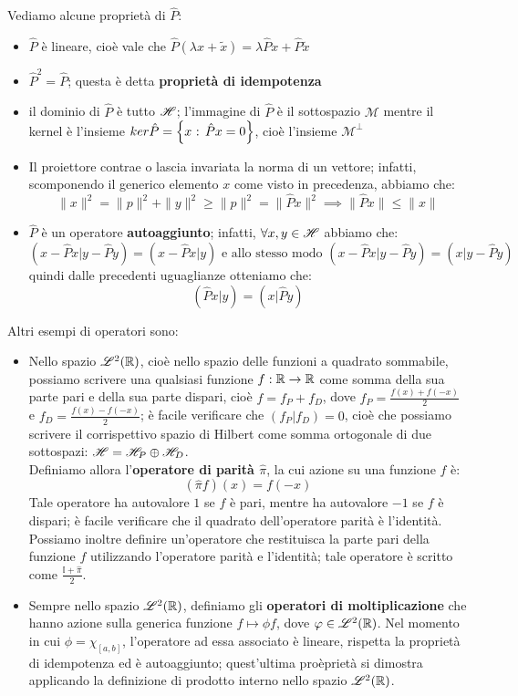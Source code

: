 Vediamo alcune proprietà di $\hat{P}$:
\begin{itemize}
\item $\hat{P}$ è lineare, cioè vale che $\hat{P}(\lambda x + \tilde{x})=\lambda \hat{P}x+\hat{P} \tilde{x}$
\item $\hat{P}^2=\hat{P}$; questa è detta \textbf{proprietà di idempotenza}
\item il dominio di $\hat{P}$ è tutto $\mathscr{H}$; l'immagine di $\hat{P}$ è il sottospazio $\mathcal{M}$ mentre il kernel è l'insieme $\\ker \hat{P} = \left\{ x \text{ : } \hat{P}x=0 \right\}$, cioè l'insieme $\mathcal{M}^{\perp}$
\item Il proiettore contrae o lascia invariata la norma di un vettore; infatti, scomponendo il generico elemento $x$ come visto in precedenza, abbiamo che:
$$\|x\|^2=\|p\|^2+\|y\|^2 \geq \|p\|^2 = \| \hat{P}x \|^2 \implies \| \hat{P}x \| \leq \|x\|$$
\item $\hat{P}$ è un operatore \textbf{autoaggiunto}; infatti, $\forall x, y \in \mathscr{H}$ abbiamo che:
$$(x- \hat{P}x|y- \hat{P}y)=(x-\hat{P}x|y) \text{ e allo stesso modo } (x- \hat{P}x|y- \hat{P}y)=(x|y-\hat{P}y)$$
quindi dalle precedenti uguaglianze otteniamo che:
$$(\hat{P}x|y)=(x|\hat{P}y)$$
\end{itemize}
Altri esempi di operatori sono:
\begin{itemize}
\item Nello spazio $\mathscr{L}^2(\mathbb{R})$, cioè nello spazio delle funzioni a quadrato sommabile, possiamo scrivere una qualsiasi funzione $f: \mathbb{R} \to \mathbb{R}$ come somma della sua parte pari e della sua parte dispari, cioè $f=f_P + f_D$, dove $f_P =\frac{f(x)+f(-x)}{2}$ e $f_D =\frac{f(x)-f(-x)}{2}$; è facile verificare che $(f_P|f_D)=0$, cioè che possiamo scrivere il corrispettivo spazio di Hilbert come somma ortogonale di due sottospazi: $\mathscr{H}=\mathscr{H}_P \oplus \mathscr{H}_D$.\\Definiamo allora l'\textbf{operatore di parità $\hat{\pi}$}, la cui azione su una funzione $f$ è:
$$(\hat{\pi}f)(x)=f(-x)$$
Tale operatore ha autovalore $1$ se $f$ è pari, mentre ha autovalore $-1$ se $f$ è dispari; è facile verificare che il quadrato dell'operatore parità è l'identità. Possiamo inoltre definire un'operatore che restituisca la parte pari della funzione $f$ utilizzando l'operatore parità e l'identità; tale operatore è scritto come $\frac{\mathbb{I} + \hat{\pi}}{2}$. 
\item Sempre nello spazio $\mathscr{L}^2(\mathbb{R})$, definiamo gli \textbf{operatori di moltiplicazione} che hanno azione sulla generica funzione $f \mapsto \phi f$, dove $\varphi \in \mathscr{L}^2(\mathbb{R})$. Nel momento in cui $\phi = \chi _{[a,b]}$, l'operatore ad essa associato è lineare, rispetta la proprietà di idempotenza ed è autoaggiunto; quest'ultima proèprietà si dimostra applicando la definizione di prodotto interno nello spazio $\mathscr{L}^2(\mathbb{R})$.
\end{itemize}
